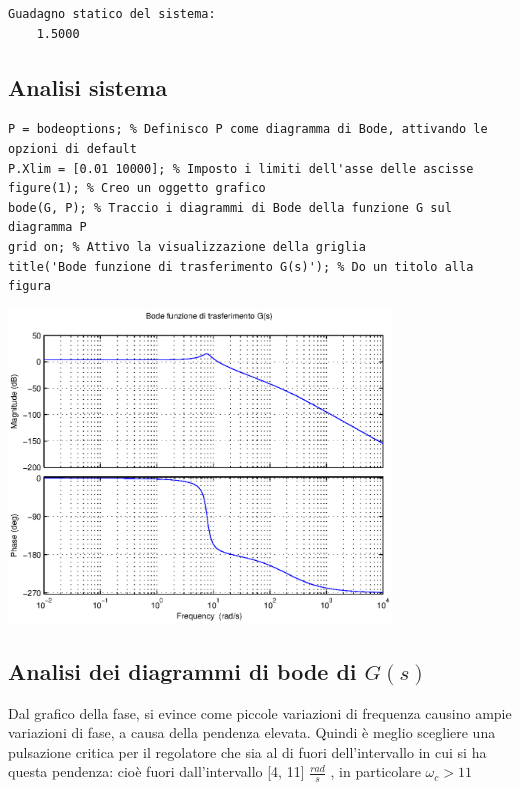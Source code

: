 \documentclass{article}
\begin{document}
        \color{lightgray} \begin{verbatim}Guadagno statico del sistema: 
    1.5000

\end{verbatim} \color{black}
    

\subsection*{Analisi sistema}

\begin{verbatim}
P = bodeoptions; % Definisco P come diagramma di Bode, attivando le opzioni di default
P.Xlim = [0.01 10000]; % Imposto i limiti dell'asse delle ascisse
figure(1); % Creo un oggetto grafico
bode(G, P); % Traccio i diagrammi di Bode della funzione G sul diagramma P
grid on; % Attivo la visualizzazione della griglia
title('Bode funzione di trasferimento G(s)'); % Do un titolo alla figura
\end{verbatim}

\includegraphics [width=4in]{prog6RADICI_01.eps}


\subsection*{Analisi dei diagrammi di bode di $ G(s) $ }

\begin{par}
Dal grafico della fase, si evince come piccole variazioni di frequenza causino ampie variazioni di fase, a causa della pendenza elevata. Quindi è meglio scegliere una pulsazione critica per il regolatore che sia al di fuori dell'intervallo in cui si ha questa pendenza: cioè fuori dall'intervallo  [4, 11] $ \frac{rad}{s} $ , in particolare  $ \omega_c > 11 $
\end{par} \vspace{1em}
\end{document}

